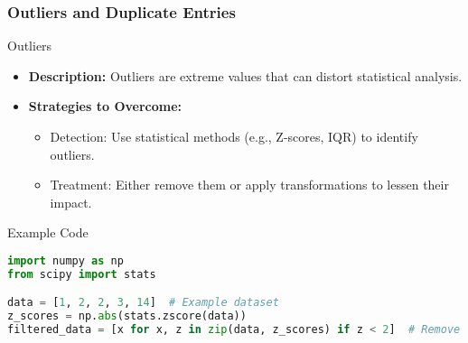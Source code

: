 \documentclass[aspectratio=169]{beamer}
\begin{document}
\begin{frame}[fragile]
    \frametitle{Outliers and Duplicate Entries}
    \begin{block}{Outliers}
        \begin{itemize}
            \item \textbf{Description:} Outliers are extreme values that can distort statistical analysis.
            \item \textbf{Strategies to Overcome:}
                \begin{itemize}
                    \item Detection: Use statistical methods (e.g., Z-scores, IQR) to identify outliers.
                    \item Treatment: Either remove them or apply transformations to lessen their impact.
                \end{itemize}
        \end{itemize}
    \end{block}
    \begin{block}{Example Code}
        \begin{lstlisting}[language=Python]
import numpy as np
from scipy import stats

data = [1, 2, 2, 3, 14]  # Example dataset
z_scores = np.abs(stats.zscore(data))
filtered_data = [x for x, z in zip(data, z_scores) if z < 2]  # Remove outliers
        \end{lstlisting}
    \end{block}
\end{frame}
\end{document}
